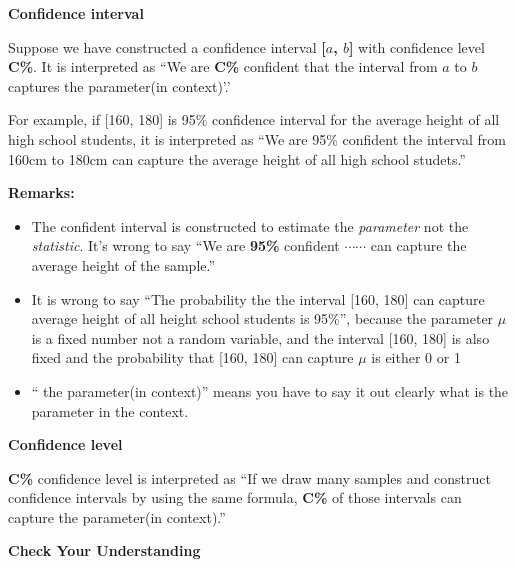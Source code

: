\documentclass[a4paper, 12pt,twoside]{book}
\begin{document}
\begin{itemize}
      \colorbox{babypink}{\parbox{\textwidth}{
            \textbf{Confidence interval} \vspace{0.3cm}
      
      Suppose we have constructed a confidence interval \textbf{[$a$, $b$]} with confidence level \textbf{C\%}.  It is interpreted as ``We are \textbf{C\%} confident that the interval from $a$ to $b$ captures the parameter(in context)'.'
      }}\vspace{0.3cm}
      
      For example, if [160, 180] is 95\% confidence interval for the average height of all high school students, it is interpreted as ``We are 95\% confident the interval from 160cm to 180cm can capture the average height of all high school studets.''\vspace{0.3cm}
      
      \textbf{Remarks:}
      \begin{itemize}[leftmargin = 0.5cm]
         \item The confident interval is constructed to estimate the \textit{parameter} not the \textit{statistic}. It's wrong to say ``We are \textbf{95\%} confident $\cdots\cdots$ can capture the average height of the sample.''
         \item It is wrong to say ``The probability the the interval [160, 180] can capture average height of all height school students is 95\%'', because the parameter $\mu$ is a fixed number not a random variable, and the interval [160, 180] is also fixed and the probability that [160, 180] can capture $\mu$ is either 0 or 1
         \item `` the parameter(in context)'' means you have to say it out clearly what is the parameter in the context. 
      \end{itemize}
      \vspace{0.6cm}
         
         \colorbox{babypink}{\parbox{\textwidth}{
         \textbf{Confidence level}\vspace{0.3cm}
         
         \textbf{C\%} confidence level is interpreted as ``If we draw many samples and construct confidence intervals by using the same formula, \textbf{C\%} of those intervals can capture the parameter(in context).''
         }}\vspace{0.6cm}
         
     \colorbox{champagne}{\parbox{\textwidth}{
     \textbf{Check Your Understanding}\vspace{0.3cm}
     
}}
\end{itemize}
\end{document}

